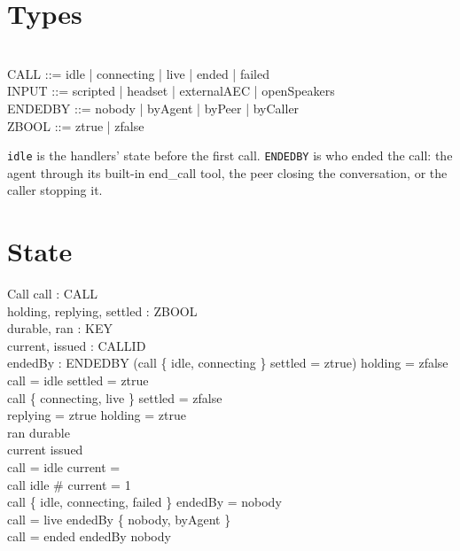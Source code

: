 \documentclass[a4paper,10pt,fleqn]{article}
\begin{document}
\section{Types}

\begin{zed}
   \\
  CALL ::= idle | connecting | live | ended | failed \\
  INPUT ::= scripted | headset | externalAEC | openSpeakers \\
  ENDEDBY ::= nobody | byAgent | byPeer | byCaller \\
  ZBOOL ::= ztrue | zfalse
\end{zed}

\texttt{idle} is the handlers' state before the first call. \texttt{ENDEDBY}
is who ended the call: the agent through its built-in end\_call tool, the
peer closing the conversation, or the caller stopping it.

\section{State}

\begin{schema}{Call}
  call : CALL \\
  holding, replying, settled : ZBOOL \\
  durable, ran : \power KEY \\
  current, issued : \power CALLID \\
  endedBy : ENDEDBY
\where
  (call \in \{ idle, connecting \} \lor settled = ztrue) \implies holding = zfalse \\
  call = idle \implies settled = ztrue \\
  call \in \{ connecting, live \} \implies settled = zfalse \\
  replying = ztrue \implies holding = ztrue \\
  ran \subseteq durable \\
  current \subseteq issued \\
  call = idle \implies current = \emptyset \\
  call \neq idle \implies \# current = 1 \\
  call \in \{ idle, connecting, failed \} \implies endedBy = nobody \\
  call = live \implies endedBy \in \{ nobody, byAgent \} \\
  call = ended \implies endedBy \neq nobody
\end{schema}
\end{document}
